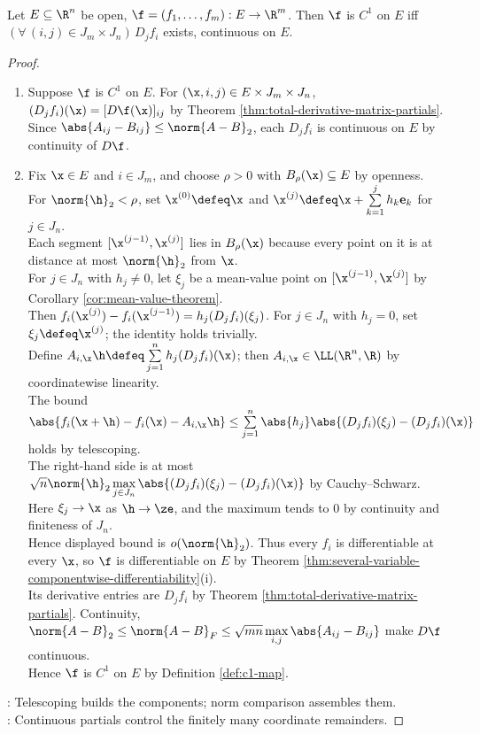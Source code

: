 \begin{theorem} \label{thm:c1-iff-continuous-partials} \\
Let $E\subseteq\R^n$ be open, $\f=(f_1,\ldots,f_m):E\to\R^m$. Then $\f$ is $C^1$ on $E$ iff $(\forall\,(i,j)\in J_m\times J_n)\,D_jf_i$ exists, continuous on $E$.
\begin{proof}
\begin{enumerate}[label=\roman*.]
\setlength{\itemsep}{0pt}
\item[$(\Rightarrow)$] Suppose $\f$ is $C^1$ on $E$. For $(\x,i,j)\in E\times J_m\times J_n$, $(D_jf_i)(\x)=[D\f(\x)]_{ij}$ by Theorem \ref{thm:total-derivative-matrix-partials}.\\
Since $\abs{A_{ij}-B_{ij}}\leq\norm{A-B}_2$, each $D_jf_i$ is continuous on $E$ by continuity of $D\f$.
\item[$(\Leftarrow)$] Fix $\x\in E$ and $i\in J_m$, and choose $\rho>0$ with $B_\rho(\x)\subseteq E$ by openness.\\
For $\norm{\h}_2<\rho$, set $\x^{(0)}\defeq\x$ and $\x^{(j)}\defeq\x+\sum\limits_{k=1}^{j}h_k\mathbf e_k$ for $j\in J_n$.\\
Each segment $[\x^{(j-1)},\x^{(j)}]$ lies in $B_\rho(\x)$ because every point on it is at distance at most $\norm{\h}_2$ from $\x$.\\
For $j\in J_n$ with $h_j\neq0$, let $\xi_j$ be a mean-value point on $[\x^{(j-1)},\x^{(j)}]$ by Corollary \ref{cor:mean-value-theorem}.\\
Then $f_i(\x^{(j)})-f_i(\x^{(j-1)})=h_j(D_jf_i)(\xi_j)$. For $j\in J_n$ with $h_j=0$, set $\xi_j\defeq\x^{(j)}$; the identity holds trivially.\\
Define $A_{i,\x}\h\defeq\sum\limits_{j=1}^{n}h_j(D_jf_i)(\x)$; then $A_{i,\x}\in\LL(\R^n,\R)$ by coordinatewise linearity.\\
The bound $\abs{f_i(\x+\h)-f_i(\x)-A_{i,\x}\h}\leq\sum\limits_{j=1}^{n}\abs{h_j}\abs{(D_jf_i)(\xi_j)-(D_jf_i)(\x)}$ holds by telescoping.\\
The right-hand side is at most $\sqrt n\norm{\h}_2\max\limits_{j\in J_n}\abs{(D_jf_i)(\xi_j)-(D_jf_i)(\x)}$ by Cauchy--Schwarz.\\
Here $\xi_j\to\x$ as $\h\to\ze$, and the maximum tends to $0$ by continuity and finiteness of $J_n$.\\
Hence displayed bound is $o(\norm{\h}_2)$. Thus every $f_i$ is differentiable at every $\x$, so $\f$ is differentiable on $E$ by Theorem \ref{thm:several-variable-componentwise-differentiability}(i).\\
Its derivative entries are $D_jf_i$ by Theorem \ref{thm:total-derivative-matrix-partials}. Continuity, $\norm{A-B}_2\leq\norm{A-B}_F\leq\sqrt{mn}\max\limits_{i,j}\abs{A_{ij}-B_{ij}}$ make $D\f$ continuous.\\
Hence $\f$ is $C^1$ on $E$ by Definition \ref{def:c1-map}.
\end{enumerate}
: Telescoping builds the components; norm comparison assembles them.\\
: Continuous partials control the finitely many coordinate remainders.
\end{proof}
\end{theorem}

